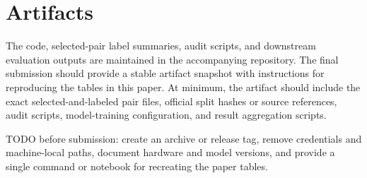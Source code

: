 \section{Artifacts}

The code, selected-pair label summaries, audit scripts, and downstream evaluation outputs are maintained in the accompanying repository. The final submission should provide a stable artifact snapshot with instructions for reproducing the tables in this paper. At minimum, the artifact should include the exact selected-and-labeled pair files, official split hashes or source references, audit scripts, model-training configuration, and result aggregation scripts.

TODO before submission: create an archive or release tag, remove credentials and machine-local paths, document hardware and model versions, and provide a single command or notebook for recreating the paper tables.
